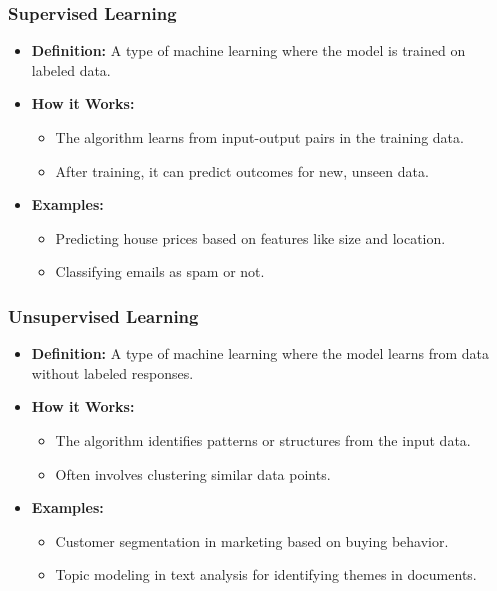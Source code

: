 \documentclass[aspectratio=169]{beamer}
\begin{document}
\begin{frame}[fragile]
    \frametitle{Supervised Learning}
    \begin{itemize}
        \item \textbf{Definition:} A type of machine learning where the model is trained on labeled data.
        \item \textbf{How it Works:}
        \begin{itemize}
            \item The algorithm learns from input-output pairs in the training data.
            \item After training, it can predict outcomes for new, unseen data.
        \end{itemize}
        \item \textbf{Examples:}
        \begin{itemize}
            \item Predicting house prices based on features like size and location.
            \item Classifying emails as spam or not.
        \end{itemize}
    \end{itemize}
\end{frame}

\begin{frame}[fragile]
    \frametitle{Unsupervised Learning}
    \begin{itemize}
        \item \textbf{Definition:} A type of machine learning where the model learns from data without labeled responses.
        \item \textbf{How it Works:}
        \begin{itemize}
            \item The algorithm identifies patterns or structures from the input data.
            \item Often involves clustering similar data points.
        \end{itemize}
        \item \textbf{Examples:}
        \begin{itemize}
            \item Customer segmentation in marketing based on buying behavior.
            \item Topic modeling in text analysis for identifying themes in documents.
        \end{itemize}
    \end{itemize}
\end{frame}
\end{document}
